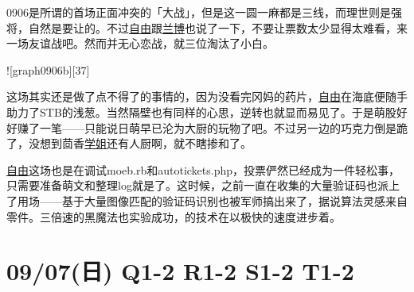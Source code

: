 
0906是所谓的首场正面冲突的「大战」，但是这一圆一麻都是三线，而理世则是强将，自然是要让的。不过\uline{自由}跟\uline{兰博}也说了一下，不要让票数太少显得太难看，来一场友谊战吧。然而并无心恋战，就三位淘汰了小白。

![graph0906b][37]

这场其实还是做了点不得了的事情的，因为没看完冈妈的药片，\uline{自由}在海底便随手助力了STB的浅葱。当然隔壁也有同样的心思，逆转也就显而易见了。于是萌股好好赚了一笔——只能说日萌早已沦为大厨的玩物了吧。不过另一边的巧克力倒是跪了，没想到茴香\uline{学姐}还有人厨啊，就不瞎掺和了。

\uline{自由}这场也是在调试moeb.rb和autotickets.php，投票俨然已经成为一件轻松事，只需要准备萌文和整理log就是了。这时候，之前一直在收集的大量验证码也派上了用场——基于大量图像匹配的验证码识别也被军师搞出来了，据说算法灵感来自零件。三倍速的黑魔法也实验成功，的技术在以极快的速度进步着。

\section{09/07(日) Q1-2 R1-2 S1-2 T1-2}

